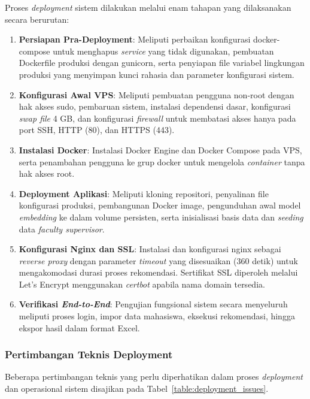 Proses \textit{deployment} sistem dilakukan melalui enam tahapan yang dilaksanakan secara berurutan:

\begin{enumerate}
\def\labelenumi{\arabic{enumi}.}
\item
  \textbf{Persiapan Pra-Deployment}: Meliputi perbaikan konfigurasi docker-compose untuk menghapus \textit{service} yang tidak digunakan, pembuatan Dockerfile produksi dengan gunicorn, serta penyiapan file variabel lingkungan produksi yang menyimpan kunci rahasia dan parameter konfigurasi sistem.
\item
  \textbf{Konfigurasi Awal VPS}: Meliputi pembuatan pengguna non-root dengan hak akses sudo, pembaruan sistem, instalasi dependensi dasar, konfigurasi \textit{swap file} 4 GB, dan konfigurasi \textit{firewall} untuk membatasi akses hanya pada port SSH, HTTP (80), dan HTTPS (443).
\item
  \textbf{Instalasi Docker}: Instalasi Docker Engine dan Docker Compose pada VPS, serta penambahan pengguna ke grup docker untuk mengelola \textit{container} tanpa hak akses root.
\item
  \textbf{Deployment Aplikasi}: Meliputi kloning repositori, penyalinan file konfigurasi produksi, pembangunan Docker image, pengunduhan awal model \textit{embedding} ke dalam volume persisten, serta inisialisasi basis data dan \textit{seeding} data \textit{faculty supervisor}.
\item
  \textbf{Konfigurasi Nginx dan SSL}: Instalasi dan konfigurasi nginx sebagai \textit{reverse proxy} dengan parameter \textit{timeout} yang disesuaikan (360 detik) untuk mengakomodasi durasi proses rekomendasi. Sertifikat SSL diperoleh melalui Let's Encrypt menggunakan \textit{certbot} apabila nama domain tersedia.
\item
  \textbf{Verifikasi \textit{End-to-End}}: Pengujian fungsional sistem secara menyeluruh meliputi proses login, impor data mahasiswa, eksekusi rekomendasi, hingga ekspor hasil dalam format Excel.
\end{enumerate}

\subsubsection{Pertimbangan Teknis Deployment}\label{pertimbangan-teknis-deployment}

Beberapa pertimbangan teknis yang perlu diperhatikan dalam proses \textit{deployment} dan operasional sistem disajikan pada Tabel~\ref{table:deployment_issues}.

